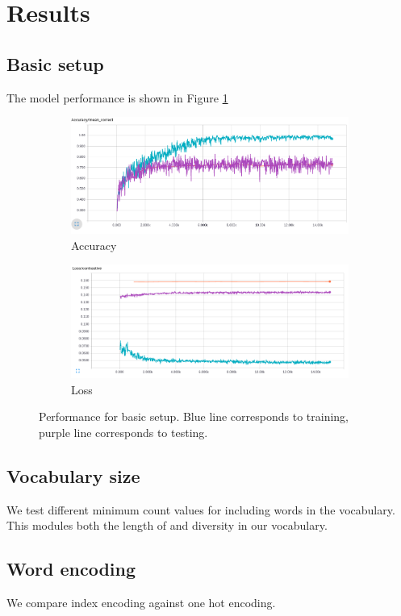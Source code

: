 \documentclass{article}
\begin{document}
\section{Results}
\subsection{Basic setup}

The model performance is shown in Figure \ref{fig:performance}

\begin{figure}[H]
  \centering
  \begin{subfigure}{\textwidth}
  	\centering
  	\includegraphics[width=0.75\linewidth]{./images/accuracy.png}
  	\caption{Accuracy}
  \end{subfigure}
  \begin{subfigure}{\textwidth}
  	\centering
  	\includegraphics[width=0.75\linewidth]{./images/loss.png}
  	\caption{Loss}
  \end{subfigure}
  \caption{Performance for basic setup. Blue line corresponds to training, purple line corresponds to testing.}
  	\label{fig:performance}
\end{figure}

\subsection{Vocabulary size}
We test different minimum count values for including words in the vocabulary. This modules both the length of and diversity in our vocabulary.

\subsection{Word encoding}
We compare index encoding against one hot encoding.
\end{document}
